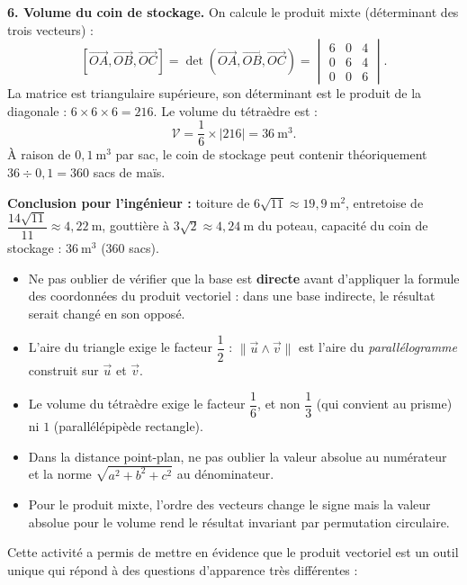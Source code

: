 \documentclass[11pt]{article}
\newcommand{\cle}[1]{{\popxbold\color{popdark}#1}}
\newcounter{popsec}
\newcounter{popsub}
\newcommand{\courssub}[1]{%
  \stepcounter{popsub}%
  \par\vspace{9pt}\noindent{\popxbold\fontsize{11.5}{13}\selectfont\color{popink}{\color{poporange}\thepopsec.\thepopsub}\hspace{6pt}#1}\par\nopagebreak\vspace{4pt}
}
\begin{document}
\begin{exoresolu}
\textbf{6. Volume du coin de stockage.}
On calcule le produit mixte (déterminant des trois vecteurs) :
\[ \left[\overrightarrow{OA},\overrightarrow{OB},\overrightarrow{OC}\right]=\det(\overrightarrow{OA},\overrightarrow{OB},\overrightarrow{OC})=\begin{vmatrix} 6 & 0 & 4 \\ 0 & 6 & 4 \\ 0 & 0 & 6 \end{vmatrix}. \]
La matrice est triangulaire supérieure, son déterminant est le produit de la diagonale : $6 \times 6 \times 6 = 216$.
Le volume du tétraèdre est :
\[ \mathscr{V}=\frac{1}{6}\times|216|=36\ \mathrm{m}^3. \]
À raison de $0{,}1\ \mathrm{m}^3$ par sac, le coin de stockage peut contenir théoriquement $36\div 0{,}1=360$ sacs de maïs.

\textbf{Conclusion pour l'ingénieur :} toiture de $6\sqrt{11}\approx 19{,}9\ \mathrm{m}^2$, entretoise de $\dfrac{14\sqrt{11}}{11}\approx 4{,}22\ \mathrm{m}$, gouttière à $3\sqrt{2}\approx 4{,}24\ \mathrm{m}$ du poteau, capacité du coin de stockage : $36\ \mathrm{m}^3$ (360 sacs).
\end{exoresolu}

\begin{attention}
\begin{itemize}
\item Ne pas oublier de vérifier que la base est \textbf{directe} avant d'appliquer la formule des coordonnées du produit vectoriel : dans une base indirecte, le résultat serait changé en son opposé.
\item L'aire du triangle exige le facteur $\dfrac{1}{2}$ : $\|\vec{u}\wedge\vec{v}\|$ est l'aire du \emph{parallélogramme} construit sur $\vec{u}$ et $\vec{v}$.
\item Le volume du tétraèdre exige le facteur $\dfrac{1}{6}$, et non $\dfrac{1}{3}$ (qui convient au prisme) ni $1$ (parallélépipède rectangle).
\item Dans la distance point-plan, ne pas oublier la valeur absolue au numérateur et la norme $\sqrt{a^2+b^2+c^2}$ au dénominateur.
\item Pour le produit mixte, l'ordre des vecteurs change le signe mais la valeur absolue pour le volume rend le résultat invariant par permutation circulaire.
\end{itemize}
\end{attention}

\courssub{Bilan de l'activité}

Cette activité a permis de mettre en évidence que le \cle{produit vectoriel} est un outil unique qui répond à des questions d'apparence très différentes :
\end{document}
